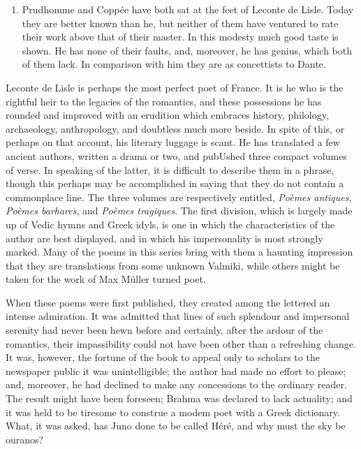 \documentclass[]{book}
\providecommand{\tightlist}{%
  \setlength{\itemsep}{0pt}\setlength{\parskip}{0pt}}
\begin{document}
\begin{enumerate}
\def\labelenumi{\Roman{enumi}.}
\setcounter{enumi}{1999}
\tightlist
\item
  Prudhomme and Coppée have both sat at the feet of Leconte de Lisle.
  Today they are better known than he, but neither of them have ventured
  to rate their work above that of their master. In this modesty much
  good taste is shown. He has none of their faults, and, moreover, he
  has genius, which both of them lack. In comparison with him they are
  as concettists to Dante.
\end{enumerate}

Leconte de Lisle is perhaps the most perfect poet of France. It is he
who is the rightful heir to the legacies of the romantics, and these
possessions he has rounded and improved with an erudition which embraces
history, philology, archaeology, anthropology, and doubtless much more
beside. In spite of this, or perhaps on that account, his literary
luggage is scant. He has translated a few ancient authors, written a
drama or two, and pubUshed three compact volumes of verse. In speaking
of the latter, it is difficult to describe them in a phrase, though this
perhaps may be accomplished in saying that they do not contain a
commonplace line. The three volumes are respectively entitled,
\emph{Poèmes antiques}, \emph{Poèmes barhares}, and \emph{Poèmes
tragiques}. The first division, which is largely made up of Vedic hymns
and Greek idyls, is one in which the characteristics of the author are
best displayed, and in which his impersonality is most strongly marked.
Many of the poems in this series bring with them a haunting impression
that they are translations from some unknown Valmiki, while others might
be taken for the work of Max Müller turned poet.

When these poems were first published, they created among the lettered
an intense admiration. It was admitted that lines of such splendour and
impersonal serenity had never been hewn before and certainly, after the
ardour of the romantics, their impassibility could not have been other
than a refreshing change. It was, however, the fortune of the book to
appeal only to scholars to the newspaper public it was unintelligible;
the author had made no effort to please; and, moreover, he had declined
to make any concessions to the ordinary reader. The result might have
been foreseen; Brahma was declared to lack actuality; and it was held to
be tiresome to construe a modem poet with a Greek dictionary. What, it
was asked, has Juno done to be called Héré, and why must the sky be
ouranos?
\end{document}
